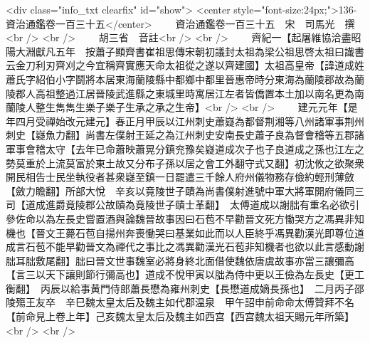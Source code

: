 <div class="info_txt clearfix" id="show">
<center style="font-size:24px;">136-資治通鑑卷一百三十五</center>
  　　資治通鑑卷一百三十五　宋　司馬光　撰<br />
<br />
　　胡三省　音註<br />
<br />
　　齊紀一【起屠維協洽盡昭陽大淵獻凡五年　按蕭子顯齊書崔祖思傳宋朝初議封太祖為梁公祖思啓太祖曰䜟書云金刀利刃齊刈之今宜稱齊實應天命太祖從之遂以齊建國】太祖高皇帝【諱道成姓蕭氏字紹伯小字鬬將本居東海蘭陵縣中都鄉中都里晉惠帝時分東海為蘭陵郡故為蘭陵郡人高祖整過江居晉陵武進縣之東城里時寓居江左者皆僑置本土加以南名更為南蘭陵人整生雋雋生樂子樂子生承之承之生帝】<br />
<br />
　　建元元年【是年四月受禪始改元建元】春正月甲辰以江州刺史蕭嶷為都督荆湘等八州諸軍事荆州刺史【嶷魚力翻】尚書左僕射王延之為江州刺史安南長史蕭子良為督會稽等五郡諸軍事會稽太守【去年已命蕭映蕭晃分鎮兖豫矣嶷道成次子也子良道成之孫也江左之勢莫重於上流莫富於東土故又分布子孫以居之會工外翻守式又翻】初沈攸之欲聚衆開民相告士民坐執役者甚衆嶷至鎮一日罷遣三千餘人府州儀物務存儉約輕刑薄斂【斂力瞻翻】所部大悅　辛亥以竟陵世子賾為尚書僕射進號中軍大將軍開府儀同三司【道成進爵竟陵郡公故賾為竟陵世子賾士革翻】　太傅道成以謝朏有重名必欲引參佐命以為左長史嘗置酒與論魏晉故事因曰石苞不早勸晉文死方慟哭方之馮異非知機也【晉文王薨石苞自揚州奔喪慟哭曰基業如此而以人臣終乎馮異勸漢光即尊位道成言石苞不能早勸晉文為禪代之事比之馮異勸漢光石苞非知機者也欲以此言感動謝朏耳朏敷尾翻】朏曰晉文世事魏室必將身終北面借使魏依唐虞故事亦當三讓彌高【言三以天下讓則節行彌高也】道成不悅甲寅以朏為侍中更以王儉為左長史【更工衡翻】　丙辰以給事黄門侍郎蕭長懋為雍州刺史【長懋道成嫡長孫也】　二月丙子邵陵殤王友卒　辛巳魏太皇太后及魏主如代郡温泉　甲午詔申前命命太傅贊拜不名【前命見上卷上年】己亥魏太皇太后及魏主如西宫【西宫魏太祖天賜元年所築】<br />
<br />
